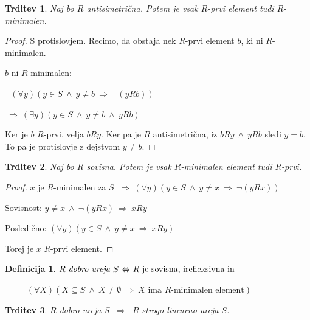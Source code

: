 \documentclass[11pt,paper=b5,footinclude,headinclude]{scrbook} %
\def\inn {{~\wedge~}}
\def\sledi {{~\Rightarrow~}}
\def\cee {{~\Leftrightarrow~}}
\newtheorem*{trditev}{Trditev}
\newtheorem*{definicija}{Definicija}
\begin{document}
\medskip

\begin{trditev}
Naj bo $R$ antisimetrična. Potem je vsak $R$-prvi element tudi $R$-minimalen.
\end{trditev}

\begin{proof}
S protislovjem. Recimo, da obstaja nek  $R$-prvi element $b$, ki ni
$R$-minimalen.

$b$ ni $R$-minimalen:

$\neg(\forall y)(y\in S\inn y\neq b\sledi \neg (yRb))$

$\sledi(\exists y)(y\in S\inn y\neq b\inn yRb)$

Ker je $b$ $R$-prvi, velja $bRy$. Ker pa je $R$ antisimetrična, iz $bRy\inn yRb$ sledi $y = b$. To pa je protislovje z dejstvom
$y \neq b$.
\end{proof}

\newpage

\begin{trditev}
Naj bo $R$ sovisna. Potem je vsak $R$-minimalen element tudi $R$-prvi.
\end{trditev}

\begin{proof}
$x$ je $R$-minimalen za $S$ $\sledi (\forall y)(y\in S\inn y\neq x\sledi \neg (yRx))$

Sovisnost: $y\neq x\inn \neg (yRx)\sledi xRy$

Posledično:
$(\forall y)(y\in S\inn y\neq x\sledi xRy)$

Torej je $x$ $R$-prvi element.
\end{proof}


\begin{definicija}
$R \textrm{ {\em dobro ureja }} S \cee R \textrm{ je sovisna, irefleksivna in }$

~~~~~$(\forall X)(X\subseteq S\inn X\neq\emptyset\sledi X \textrm{ ima $R$-minimalen element})$
\end{definicija}

\begin{trditev}
$R$ dobro ureja $S$ $\sledi$ $R$ strogo linearno ureja $S$.
\end{trditev}
\end{document}
